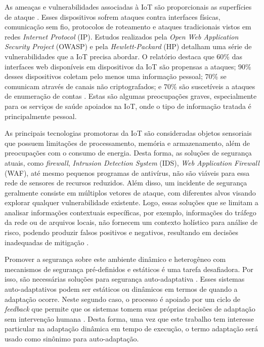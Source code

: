 \documentclass[tid,table]{texufpel} %
\begin{document}
As ameaças e vulnerabilidades associadas à IoT são proporcionais as superfícies de ataque \cite{sans17}. Esses dispositivos sofrem ataques contra interfaces físicas, comunicação sem fio, protocolos de roteamento e ataques tradicionais vistos em redes \textit{Internet Protocol} (IP). Estudos realizados pela \textit{Open Web Application Security Project } (OWASP) e pela \textit{Hewlett-Packard} (HP) detalham uma série de vulnerabilidades que a IoT precisa abordar. O relatório destaca que 60\% das interfaces web disponíveis em dispositivos da IoT são propensas a ataques; 90\% desses dispositivos coletam pelo menos uma informação pessoal; 70\% se comunicam através de canais não criptografados; e 70\% são suscetíveis a ataques de enumeração de contas \cite{hpiot15, owaspiot18}. Estas são algumas preocupações graves, especialmente para os serviços de saúde apoiados na IoT, onde o tipo de informação tratada é principalmente pessoal.



As principais tecnologias promotoras da IoT são consideradas objetos sensoriais que possuem limitações de processamento, memória e armazenamento, além de preocupações com o consumo de energia. Desta forma, as soluções de segurança atuais, como \textit{firewall}, \textit{Intrusion Detection System} (IDS), \textit{Web Application Firewall} (WAF), até mesmo pequenos programas de antivírus, não são viáveis para essa rede de sensores de recursos reduzidos. Além disso, um incidente de segurança geralmente consiste em múltiplos vetores de ataque, com diferentes alvos visando explorar qualquer vulnerabilidade existente. Logo, essas soluções que se limitam a analisar informações contextuais específicas, por exemplo, informações do tráfego da rede ou de arquivos locais, não fornecem um contexto holístico para análise de risco, podendo produzir falsos positivos e negativos, resultando em decisões inadequadas de mitigação \cite{aman15}. 

Promover a segurança sobre este ambiente dinâmico e heterogêneo com mecanismos de segurança pré-definidos e estáticos é uma tarefa desafiadora. Por isso, são necessárias soluções para segurança auto-adaptativa \cite{evesti13a}. Esses sistemas auto-adaptativos podem ser estáticos ou dinâmicos em termos de quando a adaptação ocorre. Neste segundo caso, o processo é apoiado por um ciclo de \textit{feedback} que permite que os sistemas tomem suas próprias decisões de adaptação sem intervenção humana \cite{lamprecht12}. Desta forma, uma vez que este trabalho tem interesse particular na adaptação dinâmica em tempo de execução, o termo adaptação será usado como sinônimo para auto-adaptação.
\end{document}

